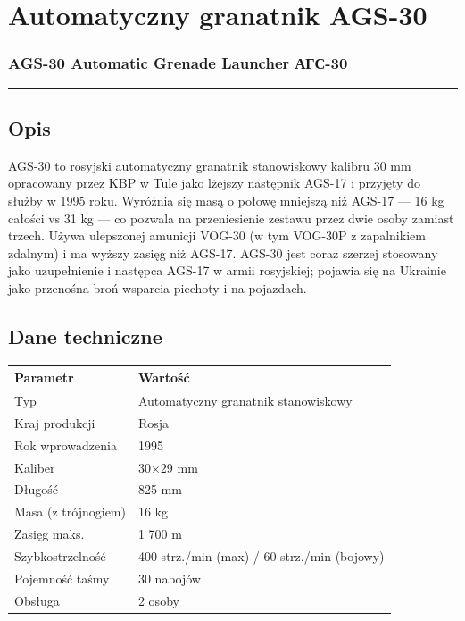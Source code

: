 \documentclass[12pt,openany,oneside]{book}
\begin{document}
\chapter{Automatyczny granatnik
AGS-30}\label{automatyczny-granatnik-ags-30}

\subsection{AGS-30 Automatic Grenade Launcher \textbar{}
АГС-30}\label{ags-30-automatic-grenade-launcher-ux430ux433ux441-30}

\begin{center}\rule{0.5\linewidth}{0.5pt}\end{center}

\section{Opis}\label{opis-83}

AGS-30 to rosyjski automatyczny granatnik stanowiskowy kalibru 30 mm
opracowany przez KBP w Tule jako lżejszy następnik AGS-17 i przyjęty do
służby w 1995 roku. Wyróżnia się masą o połowę mniejszą niż AGS-17 ---
16 kg całości vs 31 kg --- co pozwala na przeniesienie zestawu przez
dwie osoby zamiast trzech. Używa ulepszonej amunicji VOG-30 (w tym
VOG-30P z zapalnikiem zdalnym) i ma wyższy zasięg niż AGS-17. AGS-30
jest coraz szerzej stosowany jako uzupełnienie i następca AGS-17 w armii
rosyjskiej; pojawia się na Ukrainie jako przenośna broń wsparcia
piechoty i na pojazdach.

\section{Dane techniczne}\label{dane-techniczne-83}

\begin{longtable}[]{@{}ll@{}}
\toprule\noalign{}
Parametr & Wartość \\
\midrule\noalign{}
\endhead
\bottomrule\noalign{}
\endlastfoot
Typ & Automatyczny granatnik stanowiskowy \\
Kraj produkcji & Rosja \\
Rok wprowadzenia & 1995 \\
Kaliber & 30×29 mm \\
Długość & 825 mm \\
Masa (z trójnogiem) & 16 kg \\
Zasięg maks. & 1 700 m \\
Szybkostrzelność & 400 strz./min (max) / 60 strz./min (bojowy) \\
Pojemność taśmy & 30 nabojów \\
Obsługa & 2 osoby \\
\end{longtable}
\end{document}
